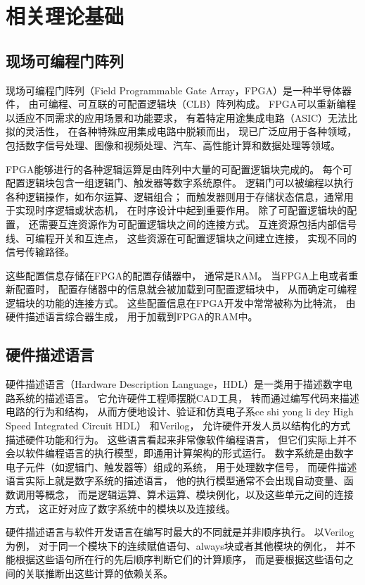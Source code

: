 \section{相关理论基础}

\subsection{现场可编程门阵列}

现场可编程门阵列（Field Programmable Gate Array，FPGA）是一种半导体器件，
由可编程、可互联的可配置逻辑块（CLB）阵列构成。
FPGA可以重新编程以适应不同需求的应用场景和功能要求，
有着特定用途集成电路（ASIC）无法比拟的灵活性，
在各种特殊应用集成电路中脱颖而出，
现已广泛应用于各种领域，
包括数字信号处理、图像和视频处理、汽车、高性能计算和数据处理等领域。

FPGA能够进行的各种逻辑运算是由阵列中大量的可配置逻辑块完成的。
每个可配置逻辑块包含一组逻辑门、触发器等数字系统原件。
逻辑门可以被编程以执行各种逻辑操作，如布尔运算、逻辑组合；
而触发器则用于存储状态信息，通常用于实现时序逻辑或状态机，
在时序设计中起到重要作用。
除了可配置逻辑块的配置，
还需要互连资源作为可配置逻辑块之间的连接方式。
互连资源包括内部信号线、可编程开关和互连点，
这些资源在可配置逻辑块之间建立连接，
实现不同的信号传输路径。

这些配置信息存储在FPGA的配置存储器中，
通常是RAM。
当FPGA上电或者重新配置时，
配置存储器中的信息就会被加载到可配置逻辑块中，
从而确定可编程逻辑块的功能的连接方式。
这些配置信息在FPGA开发中常常被称为比特流，
由硬件描述语言综合器生成，
用于加载到FPGA的RAM中。

\subsection{硬件描述语言}

硬件描述语言（Hardware Description Language，HDL）是一类用于描述数字电路系统的描述语言。
它允许硬件工程师摆脱CAD工具，
转而通过编写代码来描述电路的行为和结构，
从而方便地设计、验证和仿真电子系ce shi yong li dey High Speed Integrated Circuit HDL）
和Verilog，
允许硬件开发人员以结构化的方式描述硬件功能和行为。
这些语言看起来非常像软件编程语言，
但它们实际上并不会以软件编程语言的执行模型，即通用计算架构的形式运行。
数字系统是由数字电子元件（如逻辑门、触发器等）组成的系统，
用于处理数字信号，
而硬件描述语言实际上就是数字系统的描述语言，
他的执行模型通常不会出现自动变量、函数调用等概念，
而是逻辑运算、算术运算、模块例化，以及这些单元之间的连接方式，
这正好对应了数字系统中的模块以及连接线。

硬件描述语言与软件开发语言在编写时最大的不同就是并非顺序执行。
以Verilog为例，
对于同一个模块下的连续赋值语句、always块或者其他模块的例化，
并不能根据这些语句所在行的先后顺序判断它们的计算顺序，
而是要根据这些语句之间的关联推断出这些计算的依赖关系。

